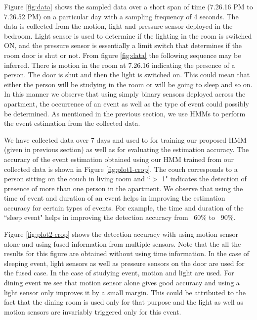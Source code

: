 \documentclass[10pt, conference, compsocconf]{IEEEtran}
\begin{document}
Figure \ref{fig:data} shows the sampled data over a short span of time (7.26.16 PM to 7.26.52 PM) on a particular day with a sampling frequency of 4 seconds. The data is collected from the motion, light and pressure sensor deployed in the bedroom. Light sensor is used to determine if the lighting in the room is switched ON, and the pressure sensor is essentially a limit switch that determines if the room door is shut or not. 
From figure \ref{fig:data} the following sequence may be inferred. There is motion in the room at 7.26.16 indicating the presence of a person. The door is shut and then the light is switched on. This could mean that either the person will be studying in the room or will be going to sleep and so on. In this manner we observe that using simply binary sensors deployed across the apartment, the occurrence of an event as well as the type of event could possibly be determined. As mentioned in the previous section, we use HMMs to perform the event estimation from the collected data.

We have collected data over 7 days and used to for training our proposed HMM (given in previous section) as well as for evaluating the estimation accuracy.
The accuracy of the event estimation obtained using our HMM trained from our collected data is shown in Figure \ref{fig:plot1-crop}. 
The couch corresponds to a person sitting on the couch in living room and ``$>$ 1" indicates the detection of presence of more than one person in the apartment.
We observe that using the time of event and duration of an event helps in improving the estimation accuracy for certain types of events. For example, the time and duration of the ``sleep event" helps in improving the detection accuracy from ~60\% to ~90\%. 

Figure \ref{fig:plot2-crop} shows the detection accuracy with using motion sensor alone and using fused information from multiple sensors.
Note that the all the results for this figure are obtained without using time information. In the case of sleeping event, light sensors as well as pressure sensors on the door are used for the fused case. In the case of studying event, motion and light are used. For dining event we see that motion sensor alone gives good accuracy and using a light sensor only improves it by a small margin. This could be attributed to the fact that the dining room is used only for that purpose and the light as well as motion sensors are invariably triggered only for this event.
\end{document}
